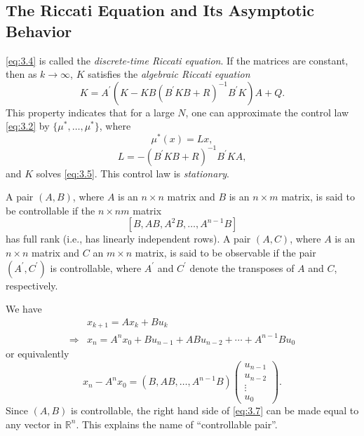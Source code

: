 \subsection*{The Riccati Equation and Its Asymptotic Behavior}
\cref{eq:3.4} is called the \textit{discrete-time Riccati equation}. If the matrices are constant, then as $k\rightarrow\infty$, $K$ satisfies the \textit{algebraic Riccati equation}
\begin{equation}\label{eq:3.5}
    K = A^\prime (K - KB(B^\prime K B + R)^{ - 1}B^\prime K)A + Q.
\end{equation}
This property indicates that for a large $N$, one can approximate the control law \cref{eq:3.2} by $\{\mu^*,\dots,\mu^*\}$, where
\begin{equation}
    \mu^*(x) = L x,
\end{equation}
\[L = -(B^\prime K B + R)^{ - 1}B^\prime K A,\] and $K$ solves \cref{eq:3.5}. This control law is \textit{stationary}.
\begin{definition}
    A pair $(A, B)$, where $A$ is an $n \times n$ matrix
    and $B$ is an $n \times m$ matrix, is said to be controllable if the $n
    \times n m$ matrix \[ \left[B, A B, A^2 B, \ldots, A^{n-1} B\right] \] has
    full rank (i.e., has linearly independent rows). A pair $(A, C)$, where $A$
    is an $n \times n$ matrix and $C$ an $m \times n$ matrix, is said to be
    observable if the pair $\left(A^{\prime}, C^{\prime}\right)$ is controllable,
    where $A^{\prime}$ and $C^{\prime}$ denote the transposes of $A$ and $C$,
    respectively.
\end{definition}
We have
\begin{align*}
    &x_{k + 1} = Ax_k + Bu_k\\
    \Rightarrow& x_n = A^n x_0 + B u_{n - 1} + AB u_{n - 2} +\cdots + A^{n - 1}Bu_0
\end{align*}
or equivalently
\begin{equation}\label{eq:3.7}
    x_n - A^n x_0 =(B,AB,\dots,A^{n - 1}B)\begin{pmatrix}
        u_{n - 1}\\
        u_{n - 2}\\
        \vdots\\
        u_0
    \end{pmatrix}.
\end{equation}
Since $(A,B)$ is controllable, the right hand side of \cref{eq:3.7} can be made equal to any vector in $\mathbb{R}^n$. This explains the name of ``controllable pair''. 

